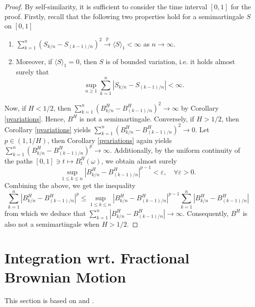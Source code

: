 \begin{proof}
    By self-similarity, it is sufficient to consider the time interval $[0,1]$ for the proof. Firstly, recall that the following two properties hold for a semimartingale $S$ on $[0,1]$
    \begin{enumerate}
        \item $\sum_{k=1}^{n}\left(S_{k/n}-S_{(k-1)/n}\right)^{2}\overset{\mathbb{P}}{\to} \langle S\rangle_{1}<\infty$ as $n\to\infty$.
        \item Moreover, if $\langle S\rangle_{1}=0$, then $S$ is of bounded variation, i.e. it holds almost surely that
        \begin{equation}
            \sup_{n\geq 1}\sum_{k=1}^{n}|S_{k/n}-S_{(k-1)/n}|<\infty. 
        \end{equation}
    \end{enumerate}
    Now, if $H<1/2$, then $\sum_{k=1}^{n}(B_{k/n}^{H}-B_{(k-1)/n}^{H})^{2}\to \infty$ by Corollary \ref{pvariations}. Hence, $B^H$ is not a semimartingale. Conversely, if $H>1/2$, then Corollary \ref{pvariations} yields $\sum_{k=1}^{n}(B_{k/n}^{H}-B_{(k-1)/n}^{H})^{2}\to 0$. Let $p\in (1,1/H)$, then Corollary \ref{pvariations} again yields $\sum_{k=1}^{n}(B_{k/n}^{H}-B_{(k-1)/n}^{H})^{p}\to \infty$. Additionally, by the uniform continuity of the paths $[0,1]\ni t\mapsto B_{t}^{H}(\omega)$, we obtain almost surely
    \begin{equation}
        \sup_{1\leq k\leq n}|B_{k/n}^{H}-B_{(k-1)/n}^{H}|^{p-1}<\varepsilon, \quad \forall \varepsilon>0.
    \end{equation}
    Combining the above, we get the inequality
    \begin{equation}
        \sum_{k=1}^{n}\left|B_{k/n}^{H}-B_{(k-1)/n}^{H}\right|^{p}\leq \sup_{1\leq k\leq n}|B_{k/n}^{H}-B_{(k-1)/n}^{H}|^{p-1}\sum_{k=1}^{n}\left|B_{k/n}^{H}-B_{(k-1)/n}^{H}\right|
    \end{equation}
    from which we deduce that $\sum_{k=1}^{n}|B_{k/n}^{H}-B_{(k-1)/n}^{H}|\to \infty$. Consequently, $B^H$ is also not a semimartingale when $H>1/2$.
\end{proof}
\section{Integration wrt. Fractional Brownian Motion}\label{sec:integration}
This section is based on \cite{fBMbook} and \cite{intbook}.

